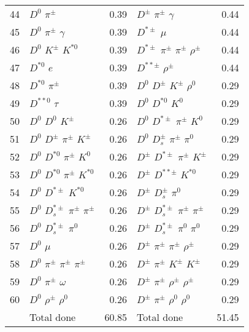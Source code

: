 \documentclass[6pt]{article}
\begin{document}
\begin{tabular}{rlr|lr}
44 & $D^0$ $\pi^{\pm}$ & 0.39 & $D^{\pm}$ $\pi^{\pm}$ $\gamma$ & 0.44 \\
45 & $D^0$ $\pi^{\pm}$ $\gamma$ & 0.39 & $D^{*\pm}$ $\mu$ & 0.44 \\
46 & $D^0$ $K^{\pm}$ $K^{*0}$ & 0.39 & $D^{*\pm}$ $\pi^{\pm}$ $\pi^{\pm}$ $\rho^{\pm}$ & 0.44 \\
47 & $D^{*0}$ $e$ & 0.39 & $D^{**\pm}$ $\rho^{\pm}$ & 0.44 \\
48 & $D^{*0}$ $\pi^{\pm}$ & 0.39 & $D^0$ $D^{\pm}$ $K^{\pm}$ $\rho^0$ & 0.29 \\
49 & $D^{**0}$ $\tau$ & 0.39 & $D^0$ $D^{*0}$ $K^0$ & 0.29 \\
50 & $D^0$ $D^0$ $K^{\pm}$ & 0.26 & $D^0$ $D^{*\pm}$ $\pi^{\pm}$ $K^0$ & 0.29 \\
51 & $D^0$ $D^{\pm}$ $\pi^{\pm}$ $K^{\pm}$ & 0.26 & $D^0$ $D_s^{\pm}$ $\pi^{\pm}$ $\pi^0$ & 0.29 \\
52 & $D^0$ $D^{*0}$ $\pi^{\pm}$ $K^0$ & 0.26 & $D^{\pm}$ $D^{*\pm}$ $\pi^{\pm}$ $K^{\pm}$ & 0.29 \\
53 & $D^0$ $D^{*0}$ $\pi^{\pm}$ $K^{*0}$ & 0.26 & $D^{\pm}$ $D^{**\pm}$ $K^{*0}$ & 0.29 \\
54 & $D^0$ $D^{*\pm}$ $K^{*0}$ & 0.26 & $D^{\pm}$ $D_s^{\pm}$ $\pi^0$ & 0.29 \\
55 & $D^0$ $D_s^{*\pm}$ $\pi^{\pm}$ $\pi^{\pm}$ & 0.26 & $D^{\pm}$ $D_s^{*\pm}$ $\pi^{\pm}$ $\pi^{\pm}$ & 0.29 \\
56 & $D^0$ $D_s^{*\pm}$ $\pi^0$ & 0.26 & $D^{\pm}$ $D_s^{*\pm}$ $\pi^0$ $\pi^0$ & 0.29 \\
57 & $D^0$ $\mu$ & 0.26 & $D^{\pm}$ $\pi^{\pm}$ $\pi^{\pm}$ $\rho^{\pm}$ & 0.29 \\
58 & $D^0$ $\pi^{\pm}$ $\pi^{\pm}$ $\pi^{\pm}$ & 0.26 & $D^{\pm}$ $\pi^{\pm}$ $K^{\pm}$ $K^{\pm}$ & 0.29 \\
59 & $D^0$ $\pi^{\pm}$ $\omega$ & 0.26 & $D^{\pm}$ $\pi^{\pm}$ $\rho^{\pm}$ $\rho^{\pm}$ & 0.29 \\
60 & $D^0$ $\rho^{\pm}$ $\rho^0$ & 0.26 & $D^{\pm}$ $\pi^{\pm}$ $\rho^0$ $\rho^0$ & 0.29 \\
\hline & Total done & 60.85 & Total done & 51.45\\
\end{tabular}
\end{document}
